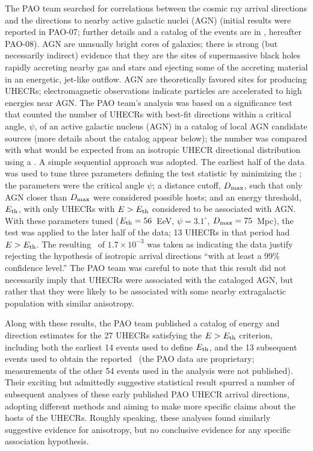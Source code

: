 The PAO team searched for correlations between the cosmic
ray arrival directions and the directions to nearby active galactic nuclei
(AGN) (initial results were reported in PAO-07; further details
and a catalog of the events are in \cite{PAO08-AGN}, hereafter PAO-08).
AGN are unusually bright cores of galaxies; there is strong (but
necessarily indirect) evidence that they are the sites of supermassive black
holes rapidly accreting nearby gas and stars and ejecting some of the
accreting material in an energetic, jet-like outflow.  AGN are theoretically
favored sites for producing UHECRs; electromagnetic observations indicate
particles are accelerated to high energies near AGN.  The PAO team's analysis
was based on a significance test that counted the number of UHECRs with
best-fit directions within a critical angle, $\psi$, of an active galactic
nucleus (AGN) in a catalog of local AGN candidate sources (more details
about the catalog appear below); the number was compared with what would be
expected from an isotropic UHECR directional distribution using a \pval.  A
simple sequential approach was adopted.  The earliest half of the data was
used to tune three parameters defining the test statistic by minimizing the
\pval; the parameters were the critical angle $\psi$; a distance cutoff,
$D_{\rm max}$, such that only AGN closer than $D_{\rm max}$ were considered possible
hosts; and an energy threshold, $E_{\rm th}$, with only UHECRs with $E>E_{\rm th}$
considered to be associated with AGN.  With these parameters tuned
($E_{\rm th}=56$~EeV, $\psi=3.1^\circ$, $D_{\rm max}=75$~Mpc), the test was applied to
the later half of the data; 13 UHECRs in that period had $E>E_{\rm th}$.  The
resulting \pval\ of $1.7\times 10^{-3}$ was taken as indicating the data
justify rejecting the hypothesis of isotropic arrival directions ``with at
least a 99\% confidence level.''  The PAO team was careful to note that this
result did not necessarily imply that UHECRs were associated with the
cataloged AGN, but rather that they were likely to be associated with some
nearby extragalactic population with similar anisotropy.

Along with these results, the PAO team published a catalog of energy and
direction estimates for the 27 UHECRs satisfying the $E>E_{\rm th}$ criterion,
including both the earliest 14 events used to define $E_{\rm th}$, and the 13
subsequent events used to obtain the reported \pval\ (the PAO data are
proprietary; measurements of the other 54 events used in the analysis were
not published).  Their exciting but admittedly suggestive statistical result
spurred a number of subsequent analyses of these early published PAO UHECR
arrival directions, adopting different methods and aiming to make more
specific claims about the hosts of the UHECRs.  Roughly speaking, these
analyses found similarly suggestive evidence for anisotropy, but no
conclusive evidence for any specific association hypothesis.

